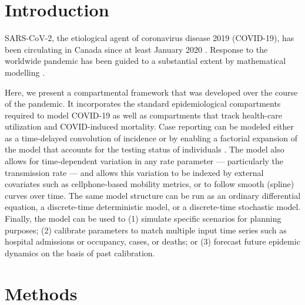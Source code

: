 \documentclass[12pt]{article}\usepackage[]{graphicx}\usepackage[]{color}
\begin{document}
\section{Introduction}

SARS-CoV-2, the etiological agent of coronavirus disease 2019 (COVID-19), has been circulating in Canada since at least January 2020 \cite{onpr_200125}.
Response to the worldwide pandemic \cite{Li+20,Fauc+20} has been guided to a substantial extent by mathematical modelling \cite{Flax+20}.


Here, we present a compartmental framework that was developed over the course of the pandemic. 
It incorporates the standard epidemiological compartments required to model COVID-19 as well as compartments that track health-care utilization and COVID-induced
mortality. 
Case reporting can be modeled either as a time-delayed convolution of incidence or by enabling a factorial expansion of the model that accounts for the testing status of individuals \cite{Fris+20}. 
The model also allows for time-dependent variation in any rate parameter --- particularly the transmission rate --- and allows this variation to be indexed by external covariates such as cellphone-based mobility metrics, or to follow smooth (spline) curves over time. 
The same model structure can be run as an ordinary differential equation, a discrete-time deterministic model, or a discrete-time stochastic model.
Finally, the model can be used to
(1) simulate specific scenarios for planning purposes;
(2) calibrate parameters to match multiple input time series such as hospital admissions or occupancy, cases, or deaths; or
(3) forecast future epidemic dynamics on the basis of past calibration.

\section{Methods}
\end{document}
